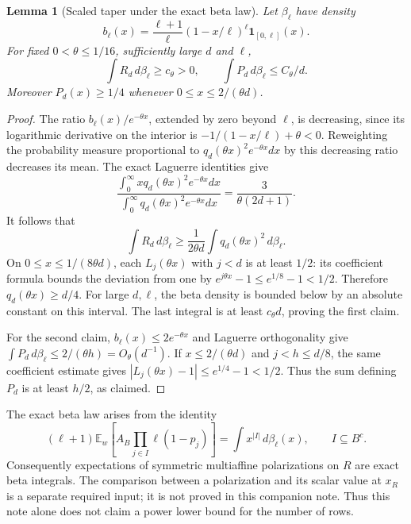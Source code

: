 \documentclass[11pt]{article}
\newtheorem{lemma}{Lemma}
\newcommand{\E}{\mathbb E}
\begin{document}
\begin{lemma}[Scaled taper under the exact beta law]
Let $\beta_\ell$ have density
\[
 b_\ell(x)=\frac{\ell+1}{\ell}(1-x/\ell)^\ell
             \boldsymbol1_{[0,\ell]}(x).
\]
For fixed $0<\theta\le1/16$, sufficiently large $d$ and $\ell$,
\[
 \int R_d\,d\beta_\ell\ge c_\theta>0,
 \qquad
 \int P_d\,d\beta_\ell\le C_\theta/d.
\tag{5}
\]
Moreover $P_d(x)\ge1/4$ whenever $0\le x\le2/(\theta d)$.
\end{lemma}
\begin{proof}
The ratio $b_\ell(x)/e^{-\theta x}$, extended by zero beyond $\ell$,
is decreasing, since its logarithmic derivative on the interior is
$-1/(1-x/\ell)+\theta<0$. Reweighting the probability measure
proportional to $q_d(\theta x)^2e^{-\theta x}dx$ by this decreasing
ratio decreases its mean. The exact Laguerre identities give
\[
 \frac{\int_0^\infty xq_d(\theta x)^2e^{-\theta x}dx}
      {\int_0^\infty q_d(\theta x)^2e^{-\theta x}dx}
 =\frac3{\theta(2d+1)}.
\]
It follows that
\[
 \int R_d\,d\beta_\ell
 \ge\frac1{2\theta d}\int q_d(\theta x)^2\,d\beta_\ell.
\]
On $0\le x\le1/(8\theta d)$, each $L_j(\theta x)$ with $j<d$
is at least $1/2$: its coefficient formula bounds the deviation from
one by $e^{j\theta x}-1\le e^{1/8}-1<1/2$.
Therefore $q_d(\theta x)\ge d/4$. For large $d,\ell$, the beta
density is bounded below by an absolute constant on this interval.
The last integral is at least $c_\theta d$, proving the first claim.

For the second claim, $b_\ell(x)\le2e^{-\theta x}$ and Laguerre
orthogonality give
$\int P_d\,d\beta_\ell\le2/(\theta h)=O_\theta(d^{-1})$.
If $x\le2/(\theta d)$ and $j<h\le d/8$, the same coefficient estimate
gives $|L_j(\theta x)-1|\le e^{1/4}-1<1/2$. Thus the sum defining
$P_d$ is at least $h/2$, as claimed.
\end{proof}

The exact beta law arises from the identity
\[
 (\ell+1)\E_w[A_B\prod_{j\in I}\ell(1-p_j)]
 =\int x^{|I|}\,d\beta_\ell(x),\qquad I\subseteq B^c.
\]
Consequently expectations of symmetric multiaffine polarizations on
$R$ are exact beta integrals. The comparison between a polarization
and its scalar value at $x_R$ is a separate required input; it is
not proved in this companion note. Thus this note alone does not
claim a power lower bound for the number of rows.
\end{document}
